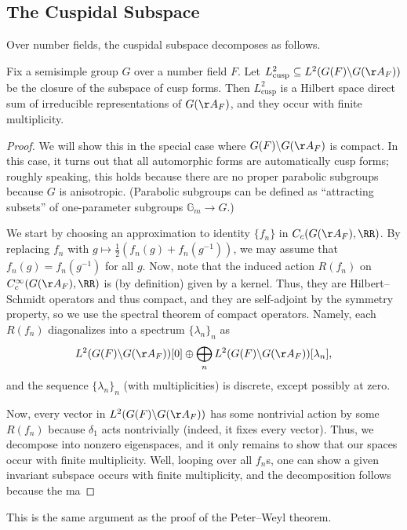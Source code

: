 \documentclass[../notes.tex]{subfiles}
\begin{document}
\subsection{The Cuspidal Subspace}
Over number fields, the cuspidal subspace decomposes as follows.
\begin{proposition}
	Fix a semisimple group $G$ over a number field $F$. Let $L^2_{\mathrm{cusp}}\subseteq L^2(G(F)\backslash G(\AA_F))$ be the closure of the subspace of cusp forms. Then $L^2_{\mathrm{cusp}}$ is a Hilbert space direct sum of irreducible representations of $G(\AA_F)$, and they occur with finite multiplicity.
\end{proposition}
\begin{proof}
	We will show this in the special case where $G(F)\backslash G(\AA_F)$ is compact. In this case, it turns out that all automorphic forms are automatically cusp forms; roughly speaking, this holds because there are no proper parabolic subgroups because $G$ is anisotropic. (Parabolic subgroups can be defined as ``attracting subsets'' of one-parameter subgroups $\mathbb G_m\to G$.)

	We start by choosing an approximation to identity $\{f_n\}$ in $C_c(G(\AA_F),\RR)$. By replacing $f_n$ with $g\mapsto\frac12\left(f_n(g)+f_n(g^{-1})\right)$, we may assume that $f_n(g)=f_n\left(g^{-1}\right)$ for all $g$. Now, note that the induced action $R(f_n)$ on $C_c^\infty(G(\AA_F),\RR)$ is (by definition) given by a kernel. Thus, they are Hilbert--Schmidt operators and thus compact, and they are self-adjoint by the symmetry property, so we use the spectral theorem of compact operators. Namely, each $R(f_n)$ diagonalizes into a spectrum $\{\lambda_n\}_n$ as
	\[L^2(G(F)\backslash G(\AA_F))[0]\oplus\bigoplus_nL^2(G(F)\backslash G(\AA_F))[\lambda_n],\]
	and the sequence $\{\lambda_n\}_n$ (with multiplicities) is discrete, except possibly at zero.
	
	Now, every vector in $L^2(G(F)\backslash G(\AA_F))$ has some nontrivial action by some $R(f_n)$ because $\delta_1$ acts nontrivially (indeed, it fixes every vector). Thus, we decompose into nonzero eigenspaces, and it only remains to show that our spaces occur with finite multiplicity. Well, looping over all $f_n$s, one can show a given invariant subspace occurs with finite multiplicity, and the decomposition follows because the ma
\end{proof}
\begin{remark}
	This is the same argument as the proof of the Peter--Weyl theorem.
\end{remark}
\end{document}
